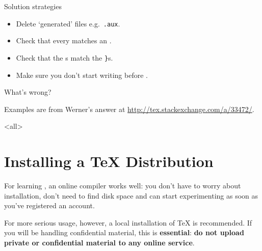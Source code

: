 \begin{frame}{Solution strategies}
	\begin{itemize}
		\item Delete ‘generated’ files e.g.\ \texttt{.aux}.
		\item Check that every  matches an .
		\item Check that the \textt{\{}s match the \texttt{\}}s.
		\item Make sure you don't start writing before .
	\end{itemize}

\end{frame}

\begin{exercise}
What's wrong?





Examples are from Werner's answer at \url{http://tex.stackexchange.com/a/33472/}.

\end{exercise}





\mode
<all>
\mode*

\clearpage
\appendix

\section<1-| beamer:0>{Installing a \TeX{} Distribution}\label{sec:tex-distros}

For learning \LaTeXe{}, an online compiler works well: you don't have to worry about installation, don't need to find disk space and can start experimenting as soon as you've registered an account.

For more serious usage, however, a local installation of \TeX{} is recommended.
If you will be handling confidential material, this is \textbf{essential}: \textbf{do not upload private or confidential material to any online service}.

